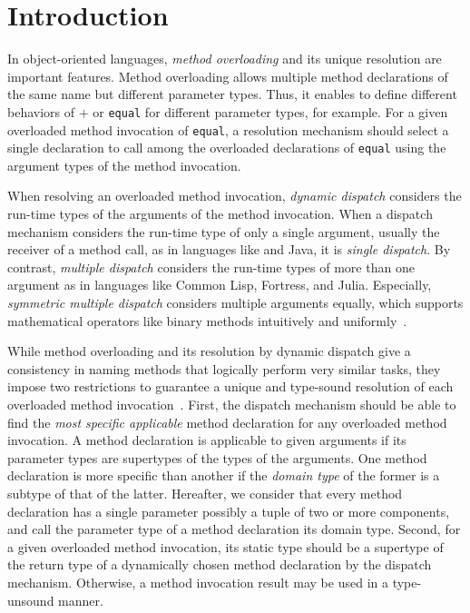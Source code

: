 \section{Introduction}\label{sec:intro}
In object-oriented languages, \textit{method overloading} and its
unique resolution are important features.  Method overloading allows
multiple method declarations of the same name but different parameter
types.  Thus, it enables to define different behaviors of $+$ or
\texttt{equal} for different parameter types, for example.  For a given
overloaded method invocation of \texttt{equal}, a resolution mechanism
should select a single declaration to call among the overloaded
declarations of \texttt{equal} using the argument types of the method invocation.

When resolving an overloaded method invocation, \textit{dynamic dispatch}
considers the run-time types of the arguments of the method invocation.
When a dispatch mechanism considers the run-time type of only a single
argument, usually the receiver of a method call, as in languages like
\CC and Java, it is \textit{single dispatch}.  By contrast,
\textit{multiple dispatch} considers the run-time types of more than one
argument as in languages like Common Lisp, Fortress, and Julia.
Especially, \textit{symmetric multiple dispatch} considers multiple
arguments equally, which supports mathematical operators like binary
methods intuitively and uniformly~\cite{clifton00}.

While method overloading and its resolution by dynamic dispatch
give a consistency in naming methods that logically perform very
similar tasks, they impose two restrictions to guarantee a unique
and type-sound resolution of each overloaded method
invocation~\cite{castagna92,castagna95}.  First, the dispatch mechanism should be
able to find the \textit{most specific applicable} method declaration for
any overloaded method invocation.  A method declaration is applicable to
given arguments if its parameter types are supertypes of the types of
the arguments.  One method declaration is more specific than another
if the \emph{domain type} of the former is a subtype of that of the
latter.  Hereafter, we consider that every method declaration has a
single parameter possibly a tuple of two or more components, and call the
parameter type of a method declaration its domain type.  Second, for a
given overloaded method invocation, its static type should be a supertype
of the return type of a dynamically chosen method declaration by the
dispatch mechanism.  Otherwise, a method invocation result may be used
in a type-unsound manner.

